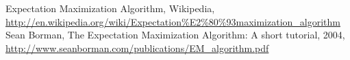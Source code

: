 	Expectation Maximization Algorithm, Wikipedia, 
	\url{http://en.wikipedia.org/wiki/Expectation%E2%80%93maximization_algorithm}
	Sean Borman, The Expectation Maximization Algorithm: A short tutorial, 2004,  
	\url{http://www.seanborman.com/publications/EM_algorithm.pdf}
